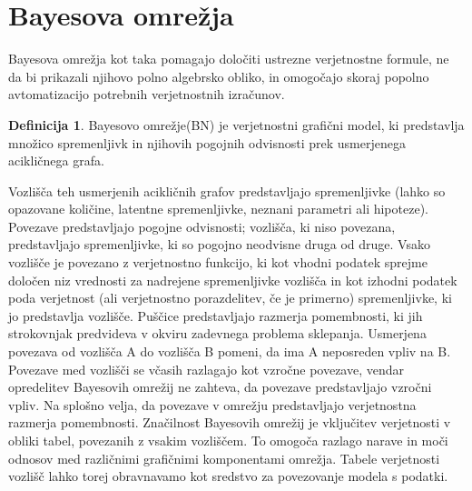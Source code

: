 \documentclass[12pt,a4paper]{amsart}
\theoremstyle{definition} %
\newtheorem{definicija}{Definicija}[section]
\theoremstyle{plain} %
\begin{document}
\section{Bayesova omrežja}
Bayesova omrežja kot taka pomagajo določiti ustrezne verjetnostne formule, ne da bi prikazali njihovo polno algebrsko obliko, in omogočajo 
skoraj popolno avtomatizacijo potrebnih verjetnostnih izračunov. 
\begin{definicija}
    Bayesovo omrežje(BN) je verjetnostni grafični model, ki predstavlja množico spremenljivk in njihovih pogojnih odvisnosti prek usmerjenega 
    acikličnega grafa.
\end{definicija}
Vozlišča teh usmerjenih acikličnih grafov predstavljajo spremenljivke (lahko so opazovane količine, latentne spremenljivke, neznani parametri 
ali hipoteze). Povezave predstavljajo pogojne odvisnosti; vozlišča, ki niso povezana, predstavljajo spremenljivke, ki so pogojno neodvisne 
druga od druge. Vsako vozlišče je povezano z verjetnostno funkcijo, ki kot vhodni podatek sprejme določen niz vrednosti za nadrejene spremenljivke 
vozlišča in kot izhodni podatek poda verjetnost (ali verjetnostno porazdelitev, če je primerno) spremenljivke, ki jo predstavlja vozlišče. Puščice 
predstavljajo razmerja pomembnosti, ki jih strokovnjak predvideva v okviru zadevnega problema sklepanja. Usmerjena povezava od vozlišča A do 
vozlišča B pomeni, da ima A neposreden vpliv na B. Povezave med vozlišči se včasih razlagajo kot vzročne povezave, vendar opredelitev Bayesovih 
omrežij ne zahteva, da povezave predstavljajo vzročni vpliv. Na splošno velja, da povezave v omrežju predstavljajo verjetnostna razmerja 
pomembnosti. Značilnost Bayesovih omrežij je vključitev verjetnosti v obliki tabel, povezanih z vsakim vozliščem. To omogoča razlago narave in 
moči odnosov med različnimi grafičnimi komponentami omrežja. Tabele verjetnosti vozlišč lahko torej obravnavamo kot sredstvo za povezovanje 
modela s podatki.

\end{document}
